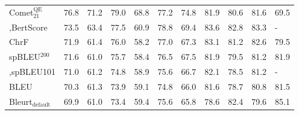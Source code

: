 \begin{tabular}{lcccc}
Comet$_\textrm{21}^\textrm{QE}$     &         76.8 &      71.2 &      79.0 &          68.8 &         77.2 &         74.8 &        81.9 &        80.6 &            81.6 &      69.5 \\
,BertScore                          &         73.5 &      63.4 &      77.5 &          60.9 &         78.8 &         69.4 &        83.6 &        82.8 &            83.3 &         - \\
ChrF                                &         71.9 &      61.4 &      76.0 &          58.2 &         77.0 &         67.3 &        83.1 &        81.2 &            82.6 &      79.5 \\
spBLEU$^\textrm{200}$               &         71.6 &      61.0 &      75.7 &          58.4 &         76.5 &         67.5 &        81.9 &        79.5 &            81.2 &      81.9 \\
,spBLEU101                          &         71.0 &      61.2 &      74.8 &          58.9 &         75.6 &         66.7 &        82.1 &        78.5 &            81.2 &         - \\
BLEU                                &         70.3 &      61.3 &      73.9 &          59.1 &         74.8 &         66.0 &        81.6 &        78.7 &            80.8 &      81.5 \\
Bleurt$_\textrm{default}$           &         69.9 &      61.0 &      73.4 &          59.4 &         75.6 &         65.8 &        78.6 &        82.4 &            79.6 &      85.1 \\
\bottomrule
\end{tabular}
